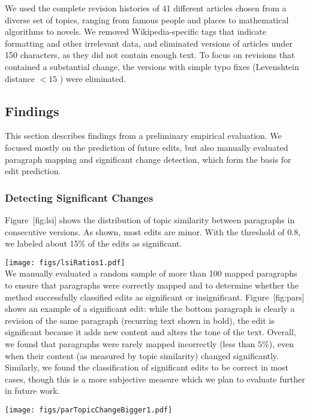 We used the complete revision histories of 41 different articles chosen
from a diverse set of topics, ranging from famous people and places to
mathematical algorithms to novels. We removed Wikipedia-specific tags
that indicate formatting and other irrelevant data, and eliminated
versions of articles under 150 characters, as they did not contain
enough text. To focus on revisions that contained a substantial change,
the versions with simple typo fixes (Levenshtein distance \(< 15\) )
were eliminated.

\subsection{Findings}\label{findings}

This section describes findings from a preliminary empirical evaluation.
We focused mostly on the prediction of future edits, but also manually
evaluated paragraph mapping and significant change detection, which form
the basis for edit prediction.

\subsubsection{Detecting Significant
Changes}\label{detecting-significant-changes}

Figure~{[}fig:lsi{]} shows the distribution of topic similarity between
paragraphs in consecutive versions. As shown, most edits are minor. With
the threshold of 0.8, we labeled about 15\% of the edits as significant.

\texttt{[image: figs/lsiRatios1.pdf]}\\

We manually evaluated a random sample of more than 100 mapped paragraphs
to ensure that paragraphs were correctly mapped and to determine whether
the method successfully classified edits as significant or
insignificant. Figure~{[}fig:pars{]} shows an example of a significant
edit: while the bottom paragraph is clearly a revision of the same
paragraph (recurring text shown in bold), the edit is significant
because it adds new content and alters the tone of the text. Overall, we
found that paragraphs were rarely mapped incorrectly (less than
\(5\%\)), even when their content (as measured by topic similarity)
changed significantly. Similarly, we found the classification of
significant edits to be correct in most cases, though this is a more
subjective measure which we plan to evaluate further in future work.

\texttt{[image: figs/parTopicChangeBigger1.pdf]}\\


